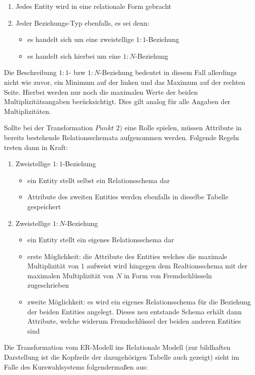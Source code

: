 \documentclass[12pt, twoside, a4paper, ngerman]{article}
\begin{document}
\begin{enumerate}
 \item Jedes Entity wird in eine relationale Form gebracht
 \item Jeder Beziehungs-Typ ebenfalls, es sei denn:
 \begin{itemize}
  \item es handelt sich um eine zweistellige $1:1$-Beziehung
  \item es handelt sich hierbei um eine $1:N$-Beziehung
 \end{itemize}
\end{enumerate}

Die Beschreibung $1:1$- bzw $1:N$-Beziehung bedeutet in diesem Fall allerdings nicht wie zuvor, ein Minimum auf der linken und das Maximum auf der rechten Seite. 
Hierbei werden nur noch die maximalen Werte der beiden Multiplizitätsangaben berücksichtigt. Dies gilt analog für alle Angaben der Multiplizitäten.

Sollte bei der Transformation $Punkt$ $2)$ eine Rolle spielen, müssen Attribute in bereits bestehende Relationsschemata aufgenommen werden. Folgende Regeln treten dann in Kraft:
\begin{enumerate}
 \item Zweistellige $1:1$-Beziehung
 \begin{itemize}
  \item ein Entity stellt selbst ein Relationsschema dar
  \item Attribute des zweiten Entities werden ebenfalls in dieselbe Tabelle gespeichert
 \end{itemize}
 \item Zweistellige $1:N$-Beziehung
 \begin{itemize}
  \item ein Entity stellt ein eigenes Relationsschema dar
  \item erste Möglichkeit: die Attribute des Entities welches die maximale Multiplizität von $1$ aufweist wird hingegen dem Realtionsschema mit der maximalen Multiplizität von $N$ in Form von Fremdschlüsseln zugeschrieben
  \item zweite Möglichkeit: es wird ein eigenes Relationsschema für die Beziehung der beiden Entities angelegt. Dieses neu entstande Schema erhält dann Attribute, welche widerum Fremdschlüssel der beiden anderen Entities sind
 \end{itemize}
\end{enumerate}

Die Transformation vom \ac{ER-Modell} ins Relationale Modell (zur bildhaften Darstellung ist die Kopfzeile der dazugehörigen Tabelle auch gezeigt) sieht im Falle des Kurswahlsystems folgendermaßen aus:
\end{document}
